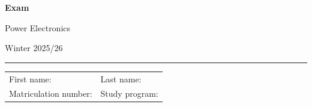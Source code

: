 \begin{center}

    {\vspace{3mm}\Large \textbf{
            \textsf{Exam}}
        \vspace{3mm}

        \LARGE
        \textsf{Power Electronics}

        \vspace{6mm}
        \large

        Winter 2025/26
        \vspace{5mm}
    }


\end{center}

\hrule


\vspace{5mm}

\begin{flushleft}
    \begin{tabular}{ll}
        First name:  \qquad \qquad \qquad  \qquad \qquad\qquad \qquad \qquad & Last name:     \\[1cm]
        Matriculation number:                                                & Study program:
    \end{tabular}
\end{flushleft}


